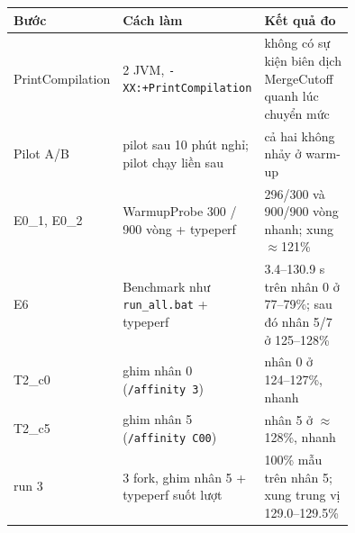 \begin{tabular}{lp{0.33\linewidth}p{0.42\linewidth}}
\toprule
Bước & Cách làm & Kết quả đo \\
\midrule
PrintCompilation & 2 JVM, \texttt{-XX:+PrintCompilation} & không có sự kiện biên dịch MergeCutoff quanh lúc chuyển mức \\
Pilot A/B & pilot sau 10 phút nghỉ; pilot chạy liền sau & cả hai không nhảy ở warm-up \\
E0\_1, E0\_2 & WarmupProbe 300 / 900 vòng + typeperf & 296/300 và 900/900 vòng nhanh; xung $\approx$121\% \\
E6 & Benchmark như \texttt{run\_all.bat} + typeperf & 3.4--130.9 s trên nhân 0 ở 77--79\%; sau đó nhân 5/7 ở 125--128\% \\
T2\_c0 & ghim nhân 0 (\texttt{/affinity 3}) & nhân 0 ở 124--127\%, nhanh \\
T2\_c5 & ghim nhân 5 (\texttt{/affinity C00}) & nhân 5 ở $\approx$128\%, nhanh \\
run 3 & 3 fork, ghim nhân 5 + typeperf suốt lượt & 100\% mẫu trên nhân 5; xung trung vị 129.0--129.5\% \\
\bottomrule
\end{tabular}
